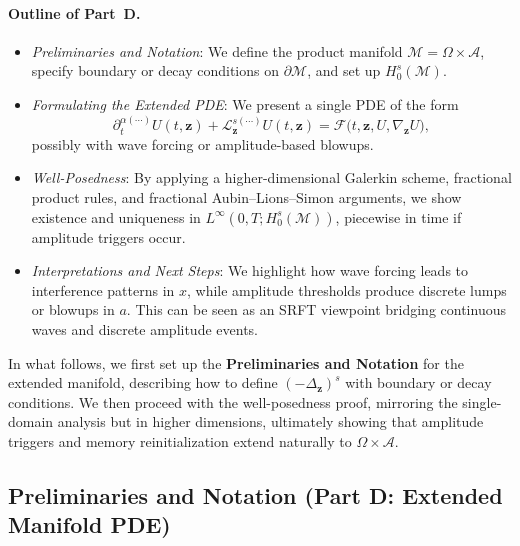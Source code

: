 \documentclass[12pt]{article}
\begin{document}
\paragraph{Outline of Part~D.}
\begin{itemize}
  \item \emph{Preliminaries and Notation}: We define the product manifold 
        \(\mathcal{M}=\Omega\times \mathcal{A}\), specify boundary or decay conditions 
        on \(\partial\mathcal{M}\), and set up $H_0^s(\mathcal{M})$.
  \item \emph{Formulating the Extended PDE}: 
        We present a single PDE of the form 
        \[
          \partial_t^{\alpha(\cdots)} U(t,\mathbf{z})
          +
          \mathcal{L}_{\mathbf{z}}^{s(\cdots)} U(t,\mathbf{z})
          =
          \mathcal{F}\bigl(t,\mathbf{z}, U,\nabla_{\mathbf{z}}U\bigr),
        \]
        possibly with wave forcing or amplitude-based blowups. 
  \item \emph{Well-Posedness}: 
        By applying a higher-dimensional Galerkin scheme, 
        fractional product rules, and fractional Aubin--Lions--Simon arguments, we show 
        existence and uniqueness in $L^\infty(0,T;H_0^s(\mathcal{M}))$, piecewise in time 
        if amplitude triggers occur.
  \item \emph{Interpretations and Next Steps}: 
        We highlight how wave forcing leads to interference patterns in $x$, while 
        amplitude thresholds produce discrete lumps or blowups in $a$. This can be seen 
        as an SRFT viewpoint bridging continuous waves and discrete amplitude events.
\end{itemize}

\medskip

In what follows, we first set up the \textbf{Preliminaries and Notation} for the 
extended manifold, describing how to define $(-\Delta_{\mathbf{z}})^s$ with boundary or 
decay conditions. We then proceed with the well-posedness proof, mirroring the single-domain 
analysis but in higher dimensions, ultimately showing that amplitude triggers and memory 
reinitialization extend naturally to $\Omega\times\mathcal{A}$.

\subsection{Preliminaries and Notation (Part D: Extended Manifold PDE)}
\label{subsec:prelim_partD}
\end{document}
